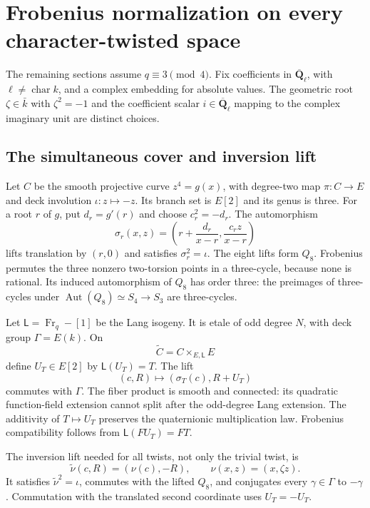 \documentclass[11pt,a4paper]{article}
\numberwithin{equation}{section}
\newcommand{\Q}{\overline{\mathbf Q}_{\ell}}
\newcommand{\Fr}{\operatorname{Fr}}
\begin{document}
\section{Frobenius normalization on every character-twisted space}
The remaining sections assume $q\equiv3\pmod4$. Fix coefficients in $\Q$, with $\ell\ne\operatorname{char}k$, and a complex embedding for absolute values. The geometric root $\zeta\in\bar k$ with $\zeta^2=-1$ and the coefficient scalar $i\in\Q$ mapping to the complex imaginary unit are distinct choices.

\subsection{The simultaneous cover and inversion lift}
Let $C$ be the smooth projective curve $z^4=g(x)$, with degree-two map $\pi:C\to E$ and deck involution $\iota:z\mapsto-z$. Its branch set is $E[2]$ and its genus is three. For a root $r$ of $g$, put $d_r=g'(r)$ and choose $c_r^2=-d_r$. The automorphism
\begin{equation}\label{eq:sigmar}
 \sigma_r(x,z)=\left(r+\frac{d_r}{x-r},\frac{c_rz}{x-r}\right)
\end{equation}
lifts translation by $(r,0)$ and satisfies $\sigma_r^2=\iota$. The eight lifts form $Q_8$. Frobenius permutes the three nonzero two-torsion points in a three-cycle, because none is rational. Its induced automorphism of $Q_8$ has order three: the preimages of three-cycles under $\operatorname{Aut}(Q_8)\simeq S_4\to S_3$ are three-cycles.

Let $\mathsf L=\Fr_q-[1]$ be the Lang isogeny. It is etale of odd degree $N$, with deck group $\Gamma=E(k)$. On
\begin{equation}
 \widetilde C=C\times_{E,\mathsf L}E
\end{equation}
define $U_T\in E[2]$ by $\mathsf L(U_T)=T$. The lift
\begin{equation}
 (c,R)\longmapsto(\sigma_T(c),R+U_T)
\end{equation}
commutes with $\Gamma$. The fiber product is smooth and connected: its quadratic function-field extension cannot split after the odd-degree Lang extension. The additivity of $T\mapsto U_T$ preserves the quaternionic multiplication law. Frobenius compatibility follows from $\mathsf L(FU_T)=FT$.

The inversion lift needed for all twists, not only the trivial twist, is
\begin{equation}\label{eq:nu}
 \widetilde\nu(c,R)=(\nu(c),-R),\qquad \nu(x,z)=(x,\zeta z).
\end{equation}
It satisfies $\widetilde\nu^2=\iota$, commutes with the lifted $Q_8$, and conjugates every $\gamma\in\Gamma$ to $-\gamma$. Commutation with the translated second coordinate uses $U_T=-U_T$.
\end{document}
